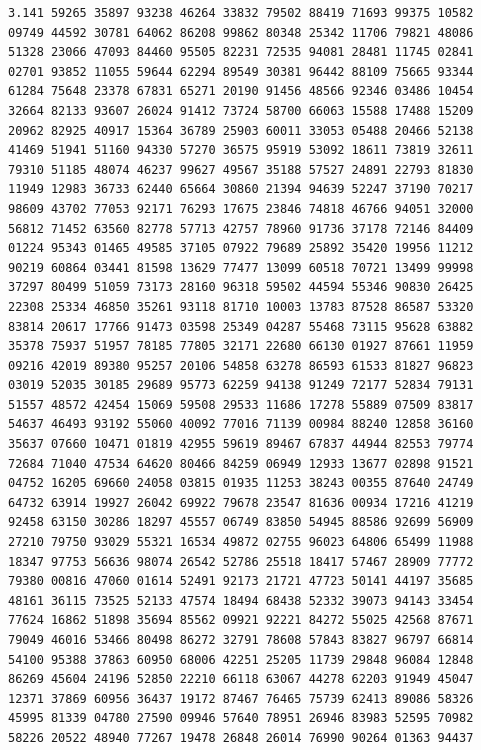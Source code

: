\documentclass[a4paper,11pt]{book}
\begin{document}
\begin{verbatim}
3.141 59265 35897 93238 46264 33832 79502 88419 71693 99375 10582 
09749 44592 30781 64062 86208 99862 80348 25342 11706 79821 48086 
51328 23066 47093 84460 95505 82231 72535 94081 28481 11745 02841 
02701 93852 11055 59644 62294 89549 30381 96442 88109 75665 93344 
61284 75648 23378 67831 65271 20190 91456 48566 92346 03486 10454 
32664 82133 93607 26024 91412 73724 58700 66063 15588 17488 15209 
20962 82925 40917 15364 36789 25903 60011 33053 05488 20466 52138 
41469 51941 51160 94330 57270 36575 95919 53092 18611 73819 32611 
79310 51185 48074 46237 99627 49567 35188 57527 24891 22793 81830 
11949 12983 36733 62440 65664 30860 21394 94639 52247 37190 70217 
98609 43702 77053 92171 76293 17675 23846 74818 46766 94051 32000 
56812 71452 63560 82778 57713 42757 78960 91736 37178 72146 84409 
01224 95343 01465 49585 37105 07922 79689 25892 35420 19956 11212 
90219 60864 03441 81598 13629 77477 13099 60518 70721 13499 99998 
37297 80499 51059 73173 28160 96318 59502 44594 55346 90830 26425 
22308 25334 46850 35261 93118 81710 10003 13783 87528 86587 53320 
83814 20617 17766 91473 03598 25349 04287 55468 73115 95628 63882 
35378 75937 51957 78185 77805 32171 22680 66130 01927 87661 11959 
09216 42019 89380 95257 20106 54858 63278 86593 61533 81827 96823 
03019 52035 30185 29689 95773 62259 94138 91249 72177 52834 79131 
51557 48572 42454 15069 59508 29533 11686 17278 55889 07509 83817 
54637 46493 93192 55060 40092 77016 71139 00984 88240 12858 36160 
35637 07660 10471 01819 42955 59619 89467 67837 44944 82553 79774 
72684 71040 47534 64620 80466 84259 06949 12933 13677 02898 91521 
04752 16205 69660 24058 03815 01935 11253 38243 00355 87640 24749 
64732 63914 19927 26042 69922 79678 23547 81636 00934 17216 41219 
92458 63150 30286 18297 45557 06749 83850 54945 88586 92699 56909 
27210 79750 93029 55321 16534 49872 02755 96023 64806 65499 11988 
18347 97753 56636 98074 26542 52786 25518 18417 57467 28909 77772 
79380 00816 47060 01614 52491 92173 21721 47723 50141 44197 35685 
48161 36115 73525 52133 47574 18494 68438 52332 39073 94143 33454 
77624 16862 51898 35694 85562 09921 92221 84272 55025 42568 87671 
79049 46016 53466 80498 86272 32791 78608 57843 83827 96797 66814 
54100 95388 37863 60950 68006 42251 25205 11739 29848 96084 12848 
86269 45604 24196 52850 22210 66118 63067 44278 62203 91949 45047 
12371 37869 60956 36437 19172 87467 76465 75739 62413 89086 58326 
45995 81339 04780 27590 09946 57640 78951 26946 83983 52595 70982 
58226 20522 48940 77267 19478 26848 26014 76990 90264 01363 94437 

\end{verbatim}
\end{document}
